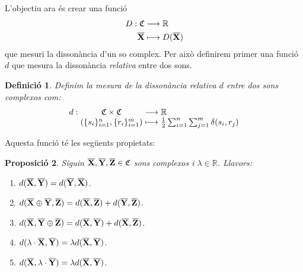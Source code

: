 \documentclass{article}
\theoremstyle{math}
\newtheorem{definition}{Definició}[section]
\newtheorem{prop}[definition]{Proposició}
\newcommand{\0}{\ensuremath{\vb{0}}}
\newcommand{\X}{\ensuremath{\vb{X}}}
\newcommand{\Y}{\ensuremath{\vb{Y}}}
\newcommand{\Z}{\ensuremath{\vb{Z}}}
\newcommand{\RR}{\ensuremath{\mathbb{R}}} %
\begin{document}
L'objectiu ara és crear una funció 
\begin{align*}
    D:\mathfrak{C}&\longrightarrow\RR\\
    \overline{\X}&\longmapsto D(\overline{\X})
\end{align*}
que mesuri la dissonància d'un so complex. Per això definirem primer una funció $d$ que mesura la dissonància \textit{relativa} entre dos sons.
\begin{definition}
    Definim la \textit{mesura de la dissonància relativa $d$} entre dos sons complexos com:
    \begin{equation*}
        \begin{array}{r@{\hspace{0.5\tabcolsep}}c@{\hspace{0.5\tabcolsep}}c@{\hspace{0.5\tabcolsep}}l}
            d:&\mathfrak{C}\times\mathfrak{C}&\longrightarrow&\RR\\
        &(\{s_i\}_{i=1}^n,\{r_i\}_{i=1}^m)&\longmapsto&\frac{1}{2}\sum_{i=1}^n\sum_{j=1}^m\delta(s_i,r_j)
        \end{array}
    \end{equation*}
\end{definition}
Aquesta funció té les següents propietats:
\begin{prop}
    Siguin $\overline{\X},\overline{\Y},\overline{\Z}\in\mathfrak{C}$ sons complexos i $\lambda\in\RR$. Llavors:
    \begin{enumerate}[label=$d$\arabic*),ref=$d$\arabic*]
        \item\label{d1} $d(\overline{\X},\overline{\Y})=d(\overline{\Y},\overline{\X})$.
        \item\label{d2} $d(\overline{\X}\oplus\overline{\Y},\overline{\Z})=d(\overline{\X},\overline{\Z})+d(\overline{\Y},\overline{\Z})$.
        \item\label{d3} $d(\overline{\X},\overline{\Y}\oplus\overline{\Z})=d(\overline{\X},\overline{\Y})+d(\overline{\X},\overline{\Z})$.
        \item\label{d4} $d(\lambda\cdot\overline{\X},\overline{\Y})=\lambda d(\overline{\X},\overline{\Y})$.
        \item\label{d5} $d(\overline{\X},\lambda\cdot\overline{\Y})=\lambda d(\overline{\X},\overline{\Y})$.
    \end{enumerate}
\end{prop}
\end{document}
